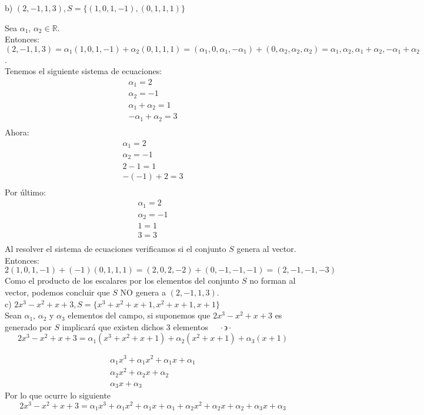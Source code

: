 \documentclass[letterpaper]{article}
\newcommand{\tq}{ \quad \cdot  \backepsilon \cdot \quad }
\renewcommand{\*}{\cdot}
\theoremstyle{definition}
\begin{document}
\noindent b) $(2,-1,1,3), S =  \lbrace (1,0,1,-1),(0,1,1,1) \rbrace$

Sea $\alpha _1$, $\alpha _2 \in \mathbb{R}$.\\
Entonces: $(2,-1,1,3)=\alpha_{1}(1,0,1,-1)+\alpha_{2}(0,1,1,1)= (\alpha_{1},0,\alpha_{1},-\alpha_{1})+(0,\alpha_{2},\alpha_{2},\alpha_{2})= \alpha_{1},\alpha_{2},\alpha_{1}+\alpha_{2},-\alpha_{1}+\alpha_{2}$.\\
Tenemos el siguiente sistema de ecuaciones:\\
\begin{eqnarray*}
\alpha_{1}=2\\
\alpha_{2} = -1\\
\alpha_{1}+\alpha_{2}=1\\
-\alpha_{1}+\alpha_{2}=3\\
\end{eqnarray*}
Ahora:\\
\begin{eqnarray*}
\alpha_{1}=2\\
\alpha_{2}= -1\\
2-1  =1\\
-(-1)+2 = 3\\
\end{eqnarray*}
Por último:
\begin{eqnarray*}
\alpha_{1}=2\\
\alpha_{2}=-1\\
1=1\\
3=3\\
\end{eqnarray*}
Al resolver el sistema de ecuaciones verificamos si el conjunto $S$ genera al vector. Entonces:
\[2(1,0,1,-1)+(-1)(0,1,1,1)=(2,0,2,-2)+(0,-1,-1,-1)=(2,-1,-1,-3)\]
Como el producto de los escalares por los elementos del conjunto $S$ no forman al vector, podemos concluir que $S$ NO genera a $(2,-1,1,3)$.\\

c) $2x^3 - x^2 + x + 3, S =  \lbrace x^3 + x^2 + x +1, x^2 + x +1, x +1 \rbrace$\\

Sean $\alpha_1 $, $\alpha_2$ y $\alpha_3$ elementos del campo, si suponemos que $2x^3 - x^2 + x + 3$ es generado por $S$ implicará que existen dichos 3 elementos $\tq$ 
\[ 2x^3 - x^2 + x + 3 = \alpha_1 (x^3 + x^2 + x +1) + \alpha_2 (x^2 + x +1) + \alpha_3 (x +1) \]

\begin{eqnarray*}
	\alpha_1 x^3 + \alpha_1 x^2 + \alpha_1 x + \alpha_1 	\\
	\alpha_2 x^2 + \alpha_2 x + \alpha_2 \\
	\alpha_3 x + \alpha_3 
\end{eqnarray*}
Por lo que ocurre lo siguiente
\[ 2x^3 - x^2 + x + 3 = \alpha_1 x^3 + \alpha_1 x^2 + \alpha_1 x + \alpha_1 + \alpha_2 x^2 + \alpha_2 x + \alpha_2 +\alpha_3 x + \alpha_3  \]
\end{document}
